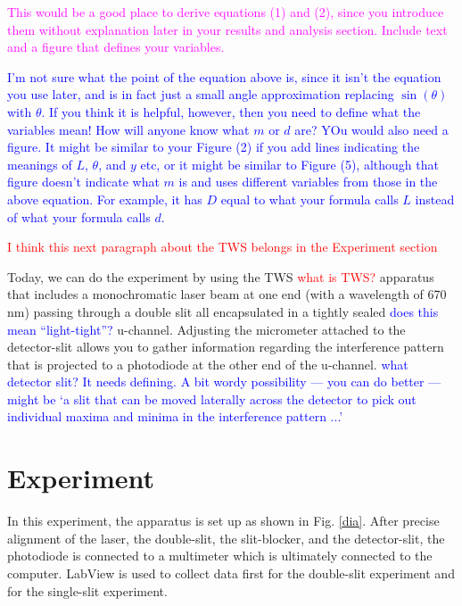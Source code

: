 \documentclass[prb,preprint]{revtex4-1}
\begin{document}
\textcolor{magenta}{This would be a good place to derive equations (1) and (2), since you introduce them without explanation later in your results and analysis section. Include text and a figure that defines your variables.}

\textcolor{blue}{I'm not sure what the point of the equation above is, since it isn't the equation you use later, and is in fact just a small angle approximation replacing $\sin(\theta)$ with $\theta$. If you think it is helpful, however, then you need to define what the variables mean!  How will anyone know what $m$ or $d$ are?  YOu would also need a figure. It might be similar to your Figure (2) if you add lines indicating the meanings of $L$, $\theta$, and $y$ etc, or it might be similar to Figure (5), although that figure doesn't indicate what $m$ is and uses different variables from those in the above equation. For example, it has $D$ equal to what your formula calls $L$ instead of what your formula calls $d$.  } 



\textcolor{red}{I think this next paragraph about the TWS belongs in the Experiment section}


Today, we can do the experiment by using the TWS \textcolor{red}{what is TWS?} apparatus that includes a monochromatic laser beam at one end (with a wavelength of 670 nm) passing through a double slit all encapsulated in a tightly sealed \textcolor{blue}{does this mean ``light-tight''?} u-channel. Adjusting the micrometer attached to the detector-slit allows you to gather information regarding the interference pattern that is projected to a photodiode at the other end of the u-channel. \textcolor{blue}{what detector slit? It needs defining. A bit wordy possibility --- you can do better --- might be `a slit that can be moved laterally across the detector to pick out individual maxima and minima in the interference pattern ...'}

\section{Experiment}
In this experiment, the apparatus is set up as shown in Fig. \ref{dia}. After precise alignment of the laser, the double-slit, the slit-blocker, and the detector-slit, the photodiode is connected to a multimeter which is ultimately connected to the computer. LabView is used to collect data first for the double-slit experiment and for the single-slit experiment. \\
\end{document}
